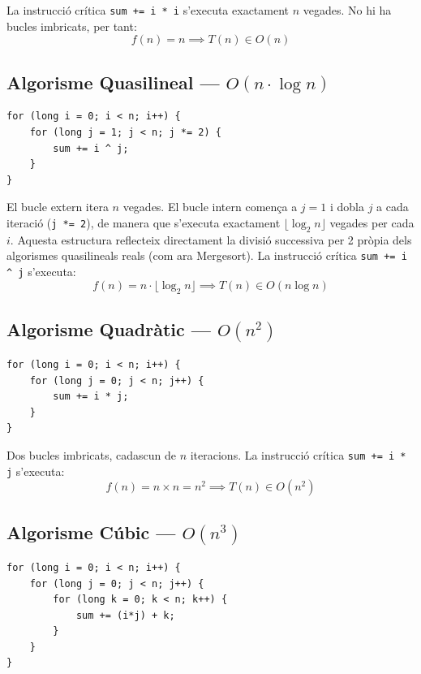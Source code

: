 \documentclass[conference,compsoc]{IEEEtran}
\begin{document}
La instrucció crítica \texttt{sum += i * i} s'executa exactament $n$
vegades. No hi ha bucles imbricats, per tant:
\begin{equation}
f(n) = n \implies T(n) \in O(n)
\end{equation}

\subsection{Algorisme Quasilineal --- $O(n \cdot \log n)$}

\begin{lstlisting}[caption={Algorisme $O(n \cdot \log n)$.}]
for (long i = 0; i < n; i++) {
    for (long j = 1; j < n; j *= 2) {
        sum += i ^ j;
    }
}
\end{lstlisting}

El bucle extern itera $n$ vegades. El bucle intern comença a $j = 1$ i
dobla $j$ a cada iteració (\texttt{j *= 2}), de manera que s'executa
exactament $\lfloor \log_2 n \rfloor$ vegades per cada $i$. Aquesta
estructura reflecteix directament la divisió successiva per 2 pròpia
dels algorismes quasilineals reals (com ara Mergesort). La instrucció
crítica \texttt{sum += i \^{} j} s'executa:
\begin{equation}
f(n) = n \cdot \lfloor \log_2 n \rfloor \implies T(n) \in O(n \log n)
\end{equation}

\subsection{Algorisme Quadràtic --- $O(n^2)$}

\begin{lstlisting}[caption={Algorisme quadràtic.}]
for (long i = 0; i < n; i++) {
    for (long j = 0; j < n; j++) {
        sum += i * j;
    }
}
\end{lstlisting}

Dos bucles imbricats, cadascun de $n$ iteracions. La instrucció crítica
\texttt{sum += i * j} s'executa:
\begin{equation}
f(n) = n \times n = n^2 \implies T(n) \in O(n^2)
\end{equation}

\subsection{Algorisme Cúbic --- $O(n^3)$}

\begin{lstlisting}[caption={Algorisme cúbic.}]
for (long i = 0; i < n; i++) {
    for (long j = 0; j < n; j++) {
        for (long k = 0; k < n; k++) {
            sum += (i*j) + k;
        }
    }
}
\end{lstlisting}
\end{document}
